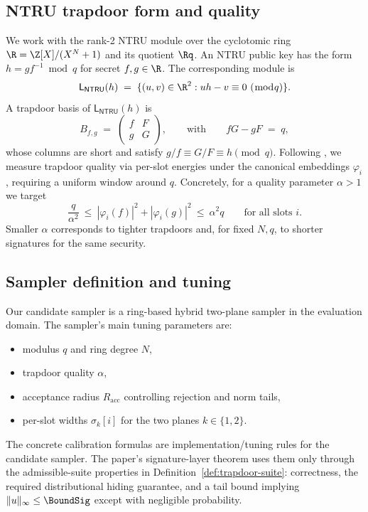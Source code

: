 \subsection{NTRU trapdoor form and quality}
\label{subsec:ntru-trapdoor}
We work with the rank-2 NTRU module over the cyclotomic ring \(\R=\Z[X]/(X^N+1)\) and its quotient \(\Rq\). An NTRU
public key has the form \(h=g f^{-1}\bmod q\) for secret \(f,g\in\R\). The corresponding module is
\[
  \mathsf{L}_{\mathsf{NTRU}}(h)
  \;=\;
  \{(u,v)\in \R^2 : u h - v \equiv 0 \ (\bmod q)\}.
\]
A trapdoor basis of \(\mathsf{L}_{\mathsf{NTRU}}(h)\) is
\[
  B_{f,g}
  \;=\;
  \begin{pmatrix}
    f & F\\
    g & G
  \end{pmatrix},
  \qquad\text{with}\qquad fG - gF \;=\; q,
\]
whose columns are short and satisfy \(g/f \equiv G/F \equiv h \pmod q\). Following \cite{EPRINT:ENSTW23}, we
measure trapdoor quality via per-slot energies under the canonical embeddings \(\varphi_i\), requiring a uniform window
around \(q\). Concretely, for a quality parameter \(\alpha>1\) we target
\[
  \frac{q}{\alpha^2} \ \le\ |\varphi_i(f)|^2 + |\varphi_i(g)|^2 \ \le\ \alpha^2 q
  \qquad\text{for all slots \(i\)}.
\]
Smaller \(\alpha\) corresponds to tighter trapdoors and, for fixed \(N,q\), to shorter signatures for the same security.

\subsection{Sampler definition and tuning}
\label{subsec:sampler-tuning}
Our candidate sampler is a ring-based hybrid two-plane sampler in the evaluation domain.  The sampler’s main
tuning parameters are:
\begin{itemize}[leftmargin=1.25em]
  \item modulus \(q\) and ring degree \(N\),
  \item trapdoor quality \(\alpha\),
  \item acceptance radius \(R_{\mathrm{acc}}\) controlling rejection and norm tails,
  \item per-slot widths \(\sigma_k[i]\) for the two planes \(k\in\{1,2\}\).
\end{itemize}

The concrete calibration formulas are implementation/tuning rules for the candidate sampler.  The paper's
signature-layer theorem uses them only through the admissible-suite properties in
Definition~\ref{def:trapdoor-suite}: correctness, the required distributional hiding guarantee, and a tail bound
implying \(\|u\|_\infty\le \BoundSig\) except with negligible probability.

